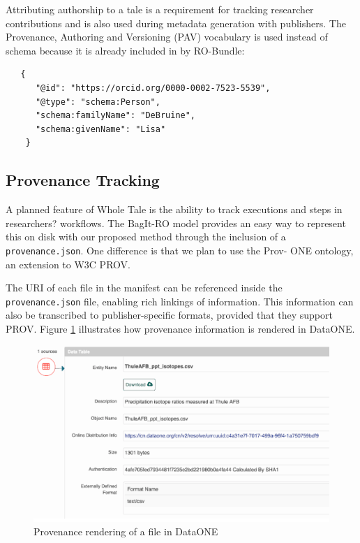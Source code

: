 \documentclass[conference]{IEEEtran}
\begin{document}
Attributing authorship to a tale is a requirement for tracking researcher contributions and is 
also used during metadata generation with publishers. The Provenance, Authoring and Versioning (PAV) vocabulary is used instead of schema because it is already included in by RO-Bundle: 

\begin{lstlisting}
   {
      "@id": "https://orcid.org/0000-0002-7523-5539",
      "@type": "schema:Person",
      "schema:familyName": "DeBruine",
      "schema:givenName": "Lisa"
    }
\end{lstlisting}
		
		
\subsection{Provenance Tracking}

A planned feature of Whole Tale is the ability to track executions and steps in researchers? 
workflows. The BagIt-RO model provides an easy way to represent this on disk with our proposed 
method through the inclusion of a \texttt{provenance.json}. One difference is that we plan to use the Prov-
ONE ontology, an extension to W3C PROV.

The URI of each file in the manifest can be referenced inside the \texttt{provenance.json} file, enabling 
rich linkings of information. This information can also be transcribed to publisher-specific 
formats, provided that they support PROV. Figure \ref{prov-fig} illustrates how provenance information is rendered in DataONE.

\begin{figure}
\centering
\includegraphics[scale=0.4]{images/dataone-prov.png}
\caption{Provenance rendering of a file in DataONE}
\label{prov-fig}
\end{figure}
\end{document}
